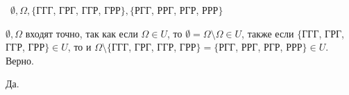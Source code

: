 \begin{solution}

\smallskip
\noindent~$\emptyset, \Omega, \{$ГГГ, ГРГ, ГГР, ГРР$\}, \{$РГГ, РРГ, РГР, РРР$\}$

\smallskip
\noindent $\emptyset, \Omega$ входят точно, так как если $\Omega \in U$, то $\emptyset = \Omega \setminus
\Omega \in U$, также если $\{$ГГГ, ГРГ, ГГР, ГРР$\} \in U$, то и $\Omega \setminus \{$ГГГ, ГРГ, ГГР, ГРР$\} = 
\{$РГГ, РРГ, РГР, РРР$\} \in U$. Верно.
\end{solution}

\begin{result}
Да.
\end{result}



